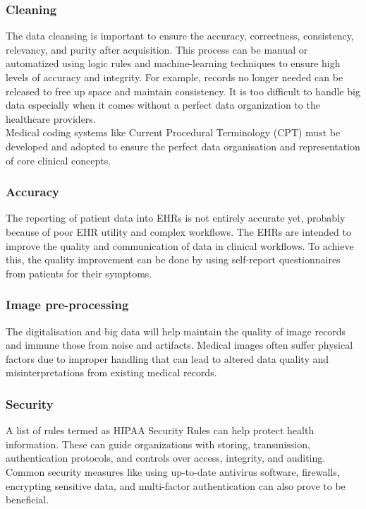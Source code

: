 \documentclass[10pt,a4paper,twoside]{article}
\begin{document}
\subsubsection*{Cleaning}
The data cleansing is important to ensure the accuracy, correctness, consistency, relevancy, and purity after acquisition. This process can be manual or automatized using logic rules and machine-learning techniques to ensure high levels of accuracy and integrity. For example, records no longer needed can be released to free up space and maintain consistency. It is too difficult to handle big data especially when it comes without a perfect data organization to the healthcare providers.\\

Medical coding systems like Current Procedural Terminology (CPT) must be developed and adopted to ensure the perfect data organisation and representation of core clinical concepts.

\subsubsection*{Accuracy}
The reporting of patient data into EHRs is not entirely accurate yet, probably because of poor EHR utility and complex workflows. The EHRs are intended to improve the quality and communication of data in clinical workflows. To achieve this, the quality improvement can be done by using self-report questionnaires from patients for their symptoms.

\subsubsection*{Image pre-processing}
The digitalisation and big data will help maintain the quality of image records and immune those from noise and artifacts. Medical images often suffer physical factors due to improper handling that can lead to altered data quality and misinterpretations from existing medical records.

\subsubsection*{Security}
A list of rules termed as HIPAA Security Rules can help protect health information. These can guide organizations with storing, transmission, authentication protocols, and controls over access, integrity, and auditing. Common security measures like using up-to-date antivirus software, firewalls, encrypting sensitive data, and multi-factor authentication can also prove to be beneficial.
\end{document}

